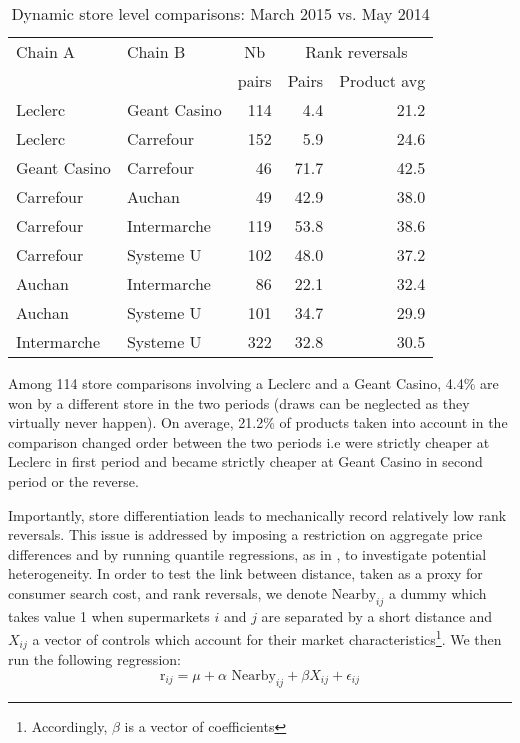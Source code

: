 \documentclass[english]{article}
\begin{document}
\begin{table}[htbp]
\caption{Dynamic store level comparisons: March 2015 vs. May 2014}
\label{tab:dynamic_compa_15km}
\begin{threeparttable}
\begin{tabular}{llr|rr}
    \toprule
    \toprule
    Chain A & Chain B & \multicolumn{1}{c|}{Nb} & \multicolumn{2}{c}{Rank reversals} \\
          &       & \multicolumn{1}{c|}{pairs} & \multicolumn{1}{c}{Pairs} & \multicolumn{1}{c}{Product avg} \\
    \midrule
    Leclerc & Geant Casino & 114   & 4.4   & 21.2 \\
    Leclerc & Carrefour & 152   & 5.9   & 24.6 \\
    Geant Casino & Carrefour & 46    & 71.7  & 42.5 \\
    Carrefour & Auchan & 49    & 42.9  & 38.0 \\
    Carrefour & Intermarche & 119   & 53.8  & 38.6 \\
    Carrefour & Systeme U & 102   & 48.0  & 37.2 \\
    Auchan & Intermarche & 86    & 22.1  & 32.4 \\
    Auchan & Systeme U & 101   & 34.7  & 29.9 \\
    Intermarche & Systeme U & 322   & 32.8  & 30.5 \\
    \bottomrule
    \bottomrule
\end{tabular}
\begin{tablenotes}
      \small
      \item Among 114 store comparisons involving a Leclerc and a Geant Casino, 4.4\% are won by a different store in the two periods (draws can be neglected as they virtually never happen). On average, 21.2\% of products taken into account in the comparison changed order between the two periods i.e were strictly cheaper at Leclerc in first period and became strictly cheaper at Geant Casino in second period or the reverse.
\end{tablenotes}
\end{threeparttable}
\end{table}

Importantly, store differentiation leads to mechanically record relatively low rank reversals. This issue is addressed by imposing a restriction on aggregate price differences and by running quantile regressions, as in \cite{TAP11}, to investigate potential heterogeneity. In order to test the link between distance, taken as a proxy for consumer search cost, and rank reversals, we denote $\text{Nearby}_{ij}$ a dummy which takes value 1 when supermarkets $i$ and $j$ are separated by a short distance and $X_{ij}$ a vector of controls which account for their market characteristics\footnote{Accordingly, $\beta$ is a vector of coefficients}. We then run the following regression:
\begin{equation}
\text{r}_{ij}= \mu + \alpha {\text{ Nearby}_{ij}} + \beta X_{ij} + \epsilon_{ij}
\end{equation}
\end{document}
